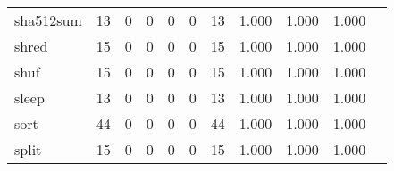 \begin{longtable}{lp{1.2cm}p{1.2cm}p{1.2cm}p{1.2cm}p{1.2cm}p{1.2cm}p{1.2cm}p{1.2cm}p{1.2cm}p{1.2cm}}
sha512sum &                                    13 &                                                  0 &                                                  0 &                                                  0 &                                                  0 &                                                 13 &                                         1.000 &                                              1.000 &                                              1.000 \\
shred     &                                    15 &                                                  0 &                                                  0 &                                                  0 &                                                  0 &                                                 15 &                                         1.000 &                                              1.000 &                                              1.000 \\
shuf      &                                    15 &                                                  0 &                                                  0 &                                                  0 &                                                  0 &                                                 15 &                                         1.000 &                                              1.000 &                                              1.000 \\
sleep     &                                    13 &                                                  0 &                                                  0 &                                                  0 &                                                  0 &                                                 13 &                                         1.000 &                                              1.000 &                                              1.000 \\
sort      &                                    44 &                                                  0 &                                                  0 &                                                  0 &                                                  0 &                                                 44 &                                         1.000 &                                              1.000 &                                              1.000 \\
split     &                                    15 &                                                  0 &                                                  0 &                                                  0 &                                                  0 &                                                 15 &                                         1.000 &                                              1.000 &                                              1.000 \\

\end{longtable}
